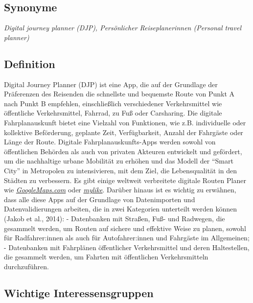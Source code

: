 \documentclass[
]{book}
\begin{document}
\hypertarget{synonyme-18}{%
\subsection*{Synonyme}\label{synonyme-18}}

\emph{Digital journey planner (DJP), Persönlicher Reiseplanerinnen (Personal travel planner)}

\hypertarget{definition-20}{%
\subsection*{Definition}\label{definition-20}}

Digital Journey Planner (DJP) ist eine App, die auf der Grundlage der Präferenzen des Reisenden die schnellste und bequemste Route von Punkt A nach Punkt B empfehlen, einschließlich verschiedener Verkehrsmittel wie öffentliche Verkehrsmittel, Fahrrad, zu Fuß oder Carsharing. Die digitale Fahrplanauskunft bietet eine Vielzahl von Funktionen, wie z.B. individuelle oder kollektive Beförderung, geplante Zeit, Verfügbarkeit, Anzahl der Fahrgäste oder Länge der Route. Digitale Fahrplanauskunfts-Apps werden sowohl von öffentlichen Behörden als auch von privaten Akteuren entwickelt und gefördert, um die nachhaltige urbane Mobilität zu erhöhen und das Modell der ``Smart City'' in Metropolen zu intensivieren, mit dem Ziel, die Lebensqualität in den Städten zu verbessern. Es gibt einige weltweit verbreitete digitale Routen Planer wie \href{https://www.google.com/maps}{\emph{GoogleMaps.com}} oder \href{https://mylike.io/personal-travel-planner/}{\emph{mylike}}. Darüber hinaus ist es wichtig zu erwähnen, dass alle diese Apps auf der Grundlage von Datenimporten und Datenvalidierungen arbeiten, die in zwei Kategorien unterteilt werden können (Jakob et al., 2014):
- Datenbanken mit Straßen, Fuß- und Radwegen, die gesammelt werden, um Routen auf sichere und effektive Weise zu planen, sowohl für Radfahrer:innen als auch für Autofahrer:innen und Fahrgäste im Allgemeinen;
- Datenbanken mit Fahrplänen öffentlicher Verkehrsmittel und deren Haltestellen, die gesammelt werden, um Fahrten mit öffentlichen Verkehrsmitteln durchzuführen.

\hypertarget{wichtige-interessensgruppen-20}{%
\subsection*{Wichtige Interessensgruppen}\label{wichtige-interessensgruppen-20}}
\end{document}

